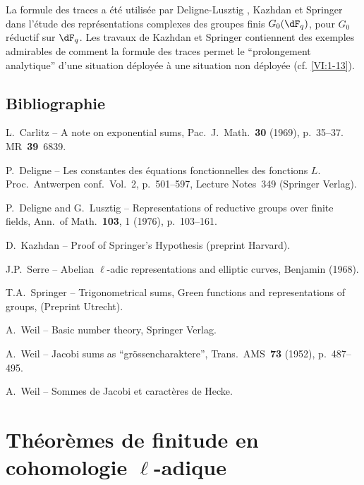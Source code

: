 La formule des traces a été utilisée par Deligne-Lusztig , 
Kazhdan  et Springer  dans l'étude des 
représentations complexes des groupes finis $G_0(\dF_q)$, pour $G_0$ 
réductif sur $\dF_q$. Les travaux de Kazhdan et Springer contiennent des 
exemples admirables de comment la formule des traces permet le ``prolongement 
analytique'' d'une situation déployée à une situation non déployée 
(cf. \ref{VI:1-13}). 








\section*{Bibliographie}
\begin{enumerate}[{[}1{]}]
\item L.~Carlitz -- A note on exponential sums, Pac.~J.~Math.~\textbf{30} (1969), p.~35--37. MR~\textbf{39}~6839.
\item P.~Deligne -- Les constantes des équations fonctionnelles des fonctions $L$.
Proc.~Antwerpen conf.~Vol.~2, p.~501--597, Lecture Notes~349 (Springer Verlag).
\item P.~Deligne and G.~Lusztig -- Representations of reductive groups over finite fields,
Ann.~of Math.~\textbf{103}, 1 (1976), p.~103--161.
\item D.~Kazhdan -- Proof of Springer's Hypothesis (preprint Harvard).
\item J.P.~Serre -- Abelian $\ell$-adic representations and elliptic curves, Benjamin (1968).
\item T.A.~Springer -- Trigonometrical sums, Green functions and representations of
 groups, (Preprint Utrecht).
\item A.~Weil -- Basic number theory, Springer Verlag.
\item A.~Weil -- Jacobi sums as ``gr\"ossencharaktere'', Trans.~AMS~\textbf{73} (1952), p.~487--495.
\item A.~Weil -- Sommes de Jacobi et caractères de Hecke.
\end{enumerate}



\chapter{Théorèmes de finitude en cohomologie \texorpdfstring{$\ell$}{l}-adique}\label{VII}










